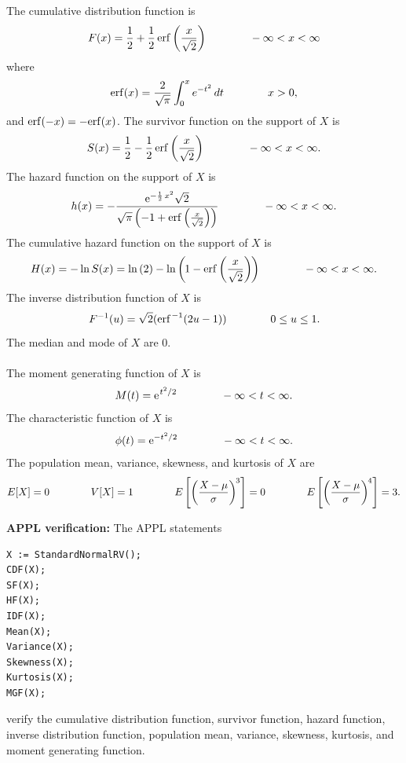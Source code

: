 \documentclass[12pt,fullpage]{article}
\begin{document}
\noindent
The cumulative distribution function is
$$
F(x) = \frac{1}{2}+\frac{1}{2}\,{{\rm erf}\left(\frac{x}{\sqrt{2}}\right)}\qquad \qquad  -\infty < x < \infty
$$
where
$$
{\rm erf}(x)=\frac{2} {\sqrt{\pi}} \int_{0} ^ {x} e ^ {-t ^ {2}} \, dt \qquad \qquad x > 0,
$$
and ${\rm erf}(-x) = - {\rm erf}(x)$.
The survivor function on the support of $X$ is
$$
S(x) = \frac{1}{2}-\frac{1}{2}\,{{\rm erf}\left(\frac{x}{\sqrt{2}}\right)}\qquad \qquad  -\infty < x < \infty .
$$
The hazard function on the support of $X$ is
$$
h(x) = -{\frac {{{\rm e}^{-\frac{1}{2}\,{x}^{2}}}\sqrt {2}}{\sqrt {\pi }
\left( -1+{{\rm erf}\left(\frac{x}{\sqrt{2}}\right)} \right) }}\qquad \qquad  -\infty < x < \infty .
$$
The cumulative hazard function on the support of $X$ is
$$
H(x) = - \ln S(x) =\ln  \left( 2 \right) -\ln  \left(\kern -0.08 em 1-
{{\rm erf}\left(\frac{x}{\sqrt{2}}\right)}\kern -0.08 em\right) \qquad \qquad  -\infty < x < \infty .
$$
The inverse distribution function of $X$ is
$$
F^{-1}(u)=\sqrt{2}({\rm erf}^{\kern 0.08 em -1}(2u-1)) \qquad \qquad 0\leq u \leq 1.
$$
The median and mode of $X$ are 0.\\
\\
The moment generating function of $X$ is
$$
M(t) = {{\rm e}^{\kern 0.08 em t^2/2}} \qquad \qquad  -\infty < t < \infty .
$$
The characteristic function of $X$ is
$$
\phi(t) = {{\rm e}^{-t^2/2}} \qquad \qquad  -\infty < t < \infty .
$$
The population mean, variance, skewness, and kurtosis of $X$ are
$$
E[X] = 0 \qquad \qquad 
V[X] = 1 \qquad \qquad 
E\left[ \left( \frac{X - \mu}{\sigma} \right) ^ {\kern -0.08 em 3} \right] = 0 \qquad \qquad 
E\left[ \left( \frac{X - \mu}{\sigma} \right) ^ {\kern -0.08 em 4} \right] = 3.
$$


\vspace{0.1in}

\noindent
{\bf APPL verification:}
The APPL statements
\begin{verbatim}
X := StandardNormalRV();
CDF(X);
SF(X);
HF(X);
IDF(X);
Mean(X);
Variance(X);
Skewness(X);
Kurtosis(X);
MGF(X);
\end{verbatim}
verify the cumulative distribution function, survivor function, hazard function, inverse distribution function, population mean, variance, skewness, kurtosis, and moment generating function.
\end{document}
